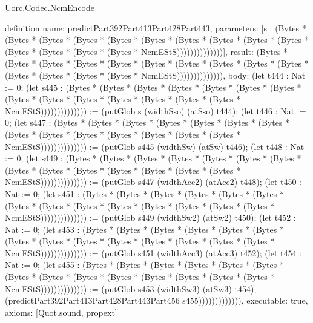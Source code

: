 \begin{lexlean}{Uorc.Codec.NcmEncode}
\begin{semanticmodule}
definition{
  name: predictPart392Part413Part428Part443,
  parameters: [s : (Bytes * (Bytes * (Bytes * (Bytes * (Bytes * (Bytes * (Bytes * (Bytes * (Bytes * (Bytes * (Bytes * (Bytes * (Bytes * (Bytes * NcmEStS))))))))))))))],
  result: (Bytes * (Bytes * (Bytes * (Bytes * (Bytes * (Bytes * (Bytes * (Bytes * (Bytes * (Bytes * (Bytes * (Bytes * (Bytes * (Bytes * NcmEStS)))))))))))))),
  body: (let t444 : Nat := 0; (let s445 : (Bytes * (Bytes * (Bytes * (Bytes * (Bytes * (Bytes * (Bytes * (Bytes * (Bytes * (Bytes * (Bytes * (Bytes * (Bytes * (Bytes * NcmEStS)))))))))))))) := (putGlob s (widthSso) (atSso) t444); (let t446 : Nat := 0; (let s447 : (Bytes * (Bytes * (Bytes * (Bytes * (Bytes * (Bytes * (Bytes * (Bytes * (Bytes * (Bytes * (Bytes * (Bytes * (Bytes * (Bytes * NcmEStS)))))))))))))) := (putGlob s445 (widthSw) (atSw) t446); (let t448 : Nat := 0; (let s449 : (Bytes * (Bytes * (Bytes * (Bytes * (Bytes * (Bytes * (Bytes * (Bytes * (Bytes * (Bytes * (Bytes * (Bytes * (Bytes * (Bytes * NcmEStS)))))))))))))) := (putGlob s447 (widthAcc2) (atAcc2) t448); (let t450 : Nat := 0; (let s451 : (Bytes * (Bytes * (Bytes * (Bytes * (Bytes * (Bytes * (Bytes * (Bytes * (Bytes * (Bytes * (Bytes * (Bytes * (Bytes * (Bytes * NcmEStS)))))))))))))) := (putGlob s449 (widthSw2) (atSw2) t450); (let t452 : Nat := 0; (let s453 : (Bytes * (Bytes * (Bytes * (Bytes * (Bytes * (Bytes * (Bytes * (Bytes * (Bytes * (Bytes * (Bytes * (Bytes * (Bytes * (Bytes * NcmEStS)))))))))))))) := (putGlob s451 (widthAcc3) (atAcc3) t452); (let t454 : Nat := 0; (let s455 : (Bytes * (Bytes * (Bytes * (Bytes * (Bytes * (Bytes * (Bytes * (Bytes * (Bytes * (Bytes * (Bytes * (Bytes * (Bytes * (Bytes * NcmEStS)))))))))))))) := (putGlob s453 (widthSw3) (atSw3) t454); (predictPart392Part413Part428Part443Part456 s455))))))))))))),
  executable: true,
  axioms: [Quot.sound, propext]
}


\end{semanticmodule}
\end{lexlean}
